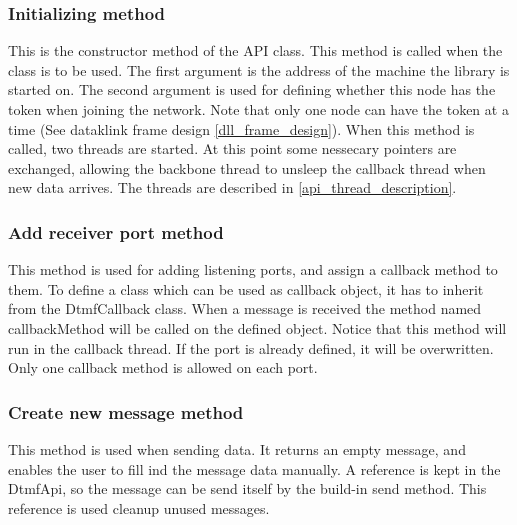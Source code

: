 \subsubsection{Initializing method}
This is the constructor method of the API class. This method is called when the class is to be used. The first argument is the address of the machine the library is started on. The second argument is used for defining whether this node has the token when joining the network. Note that only one node can have the token at a time (See dataklink frame design \ref{dll_frame_design}). When this method is called, two threads are started. At this point some nessecary pointers are exchanged, allowing the backbone thread to unsleep the callback thread when new data arrives. The threads are described in \ref{api_thread_description}.

\subsubsection{Add receiver port method}
This method is used for adding listening ports, and assign a callback method to them. To define a class which can be used as callback object, it has to inherit from the DtmfCallback class. When a message is received the method named callbackMethod will be called on the defined object. Notice that this method will run in the callback thread. If the port is already defined, it will be overwritten. Only one callback method is allowed on each port.


\subsubsection{Create new message method}
This method is used when sending data. It returns an empty message, and enables the user to fill ind the message data manually. A reference is kept in the DtmfApi, so the message can be send itself by the build-in send method. This reference is used cleanup unused messages.

